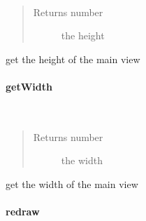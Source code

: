 \documentclass[letterpaper,10pt,english]{sphinxmanual}
\begin{document}
\begin{fulllineitems}
\label{ambrosia_web.view.mainview.MainView:ambrosia_web.view.mainview.MainView.getHeight}~\begin{quote}\begin{description}
\item[{Returns number}] \leavevmode
the height

\end{description}\end{quote}

\end{fulllineitems}


get the height of the main view


\paragraph{getWidth}
\label{ambrosia_web.view.mainview.MainView:getwidth}

\begin{fulllineitems}
\label{ambrosia_web.view.mainview.MainView:ambrosia_web.view.mainview.MainView.getWidth}~\begin{quote}\begin{description}
\item[{Returns number}] \leavevmode
the width

\end{description}\end{quote}

\end{fulllineitems}


get the width of the main view


\paragraph{redraw}
\label{ambrosia_web.view.mainview.MainView:redraw}

\begin{fulllineitems}
\label{ambrosia_web.view.mainview.MainView:ambrosia_web.view.mainview.MainView.redraw}
\end{fulllineitems}
\end{document}
